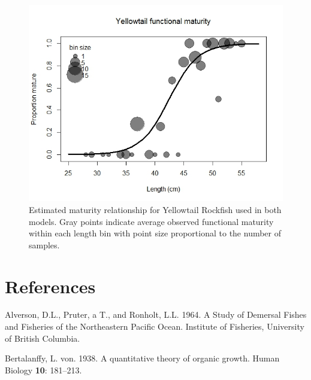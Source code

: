 \documentclass[12pt,]{article}
\begin{document}
\begin{figure}[htbp]
\centering
\includegraphics{Figures/YT_Propmat_update3_22.jpeg}
\caption{Estimated maturity relationship for Yellowtail Rockfish used in
both models. Gray points indicate average observed functional maturity
within each length bin with point size proportional to the number of
samples.\label{fig:maturity}}
\end{figure}

\FloatBarrier

\FloatBarrier

\FloatBarrier

\FloatBarrier

\FloatBarrier

\FloatBarrier

\newpage

\color{black}

\section*{References}\label{references}

\renewcommand{\thepage}{}


\hypertarget{refs}{}
\hypertarget{ref-Alverson1964}{}
Alverson, D.L., Pruter, a T., and Ronholt, L.L. 1964. A Study of
Demersal Fishes and Fisheries of the Northeastern Pacific Ocean.
Institute of Fisheries, University of British Columbia.

\hypertarget{ref-vonB1938}{}
Bertalanffy, L. von. 1938. A quantitative theory of organic growth.
Human Biology \textbf{10}: 181--213.
\end{document}
